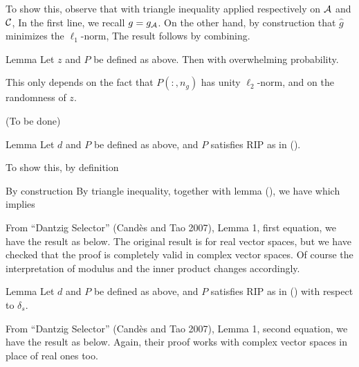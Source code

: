 To show this, observe that with triangle inequality applied respectively on \(\mathcal{A}\) and \(\mathcal{C}\),
In the first line, we recall \(g =g_{\mathcal{A}}\).
On the other hand, by construction that \(\hat{g}\) minimizes the \(\ell_1\)-norm,
The result follows by combining.

\Result
{Lemma}
{
Let \(z\) and \(P\) be defined as above.
Then
%
%
with overwhelming probability.
}

This only depends on the fact that \(P(:, n_g)\) has unity \(\ell_2\)-norm, and on the randomness of \(z\).

{ \color{red} (To be done) }

\Result
{Lemma}
{
Let \(d\) and \(P\) be defined as above, and \(P\) satisfies RIP as in ().
%
}

To show this, by definition
%

By construction
By triangle inequality, together with lemma (), we have
which implies

From ``Dantzig Selector'' (Cand\`es and Tao 2007), Lemma 1, first equation, we have the result as below.
The original result is for real vector spaces, but we have checked that the proof is completely valid in complex vector spaces.
Of course the interpretation of modulus and the inner product changes accordingly.

\Result
{Lemma}
{
Let \(d\) and \(P\) be defined as above, and \(P\) satisfies RIP as in () with respect to \(\delta_s\).
%
%
}

From ``Dantzig Selector'' (Cand\`es and Tao 2007), Lemma 1, second equation, we have the result as below.
Again, their proof works with complex vector spaces in place of real ones too.

